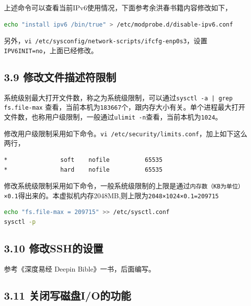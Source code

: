 \documentclass[doctor,openright,twoside]{sjtuthesis}
\newcommand{\passthrough}[1]{#1}
\theoremstyle{plain}
\theoremstyle{definition}
\theoremstyle{remark}
\theoremstyle{ocrenumbox}
\theoremstyle{plain}
\begin{document}
上述命令可以查看当前IPv6使用情况，下面参考余洪春书籍内容修改如下，

\begin{lstlisting}[language=bash]
echo "install ipv6 /bin/true" > /etc/modprobe.d/disable-ipv6.conf
\end{lstlisting}

另外，\passthrough{\lstinline!vi /etc/sysconfig/network-scripts/ifcfg-enp0s3!}，设置\passthrough{\lstinline!IPV6INIT=no!}，上面已经修改。

\hypertarget{section-135}{%
\subsection{3.9 修改文件描述符限制}\label{section-135}}

系统级别最大打开文件数，称之为系统级限制，可以通过\passthrough{\lstinline!sysctl -a | grep fs.file-max!} 查看，当前本机为\passthrough{\lstinline!183667!}个，跟内存大小有关。单个进程最大打开文件数，也称用户级限制，一般通过\passthrough{\lstinline!ulimit -n!}查看，当前本机为\passthrough{\lstinline!1024!}。

修改用户级限制采用如下命令。\passthrough{\lstinline!vi /etc/security/limits.conf!}，加上如下这么两行，

\begin{lstlisting}
*               soft    nofile          65535
*               hard    nofile          65535
\end{lstlisting}

修改系统级限制采用如下命令，一般系统级限制的上限是通过\passthrough{\lstinline!内存数（KB为单位）×0.1!}得出来的。本虚拟机内存2048MB,则上限为\passthrough{\lstinline!2048×1024×0.1=209715!}

\begin{lstlisting}[language=bash]
echo "fs.file-max = 209715" >> /etc/sysctl.conf
sysctl -p
\end{lstlisting}

\hypertarget{ssh}{%
\subsection{3.10 修改SSH的设置}\label{ssh}}

参考《深度易经 Deepin Bible》一书，后面编写。

\hypertarget{io}{%
\subsection{3.11 关闭写磁盘I/O的功能}\label{io}}
\end{document}
